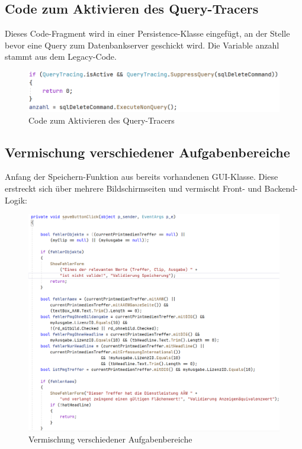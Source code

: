\documentclass[11pt,toc=sectionentrywithoutdots, 
headheight=44pt, headings=optiontoheadandtoc, hyperfootnotes=false, hypertexnames=false]{scrartcl}
\begin{document}
 \subsection{Code zum Aktivieren des Query-Tracers}
Dieses Code-Fragment wird in einer Persistence-Klasse eingefügt, an der Stelle bevor eine Query zum Datenbankserver geschickt wird. Die Variable \glqq anzahl\grqq{} stammt aus dem Legacy-Code.
 \label{fig:Code zum Aktivieren des Query-Tracers}

 \begin{figure}[H]
 \centering

	\includegraphics[scale=0.7]{snippet.png}
	 \caption{Code zum Aktivieren des Query-Tracers}
 \end{figure}


 
 \subsection{Vermischung verschiedener Aufgabenbereiche}
 \label{fig:Vermischung verschiedener Aufgabenbereiche}
Anfang der Speichern-Funktion aus bereits vorhandenen GUI-Klasse. Diese erstreckt sich über mehrere Bildschirmseiten und vermischt Front- und Backend-Logik:
 \begin{figure}[htp]
 \centering

	\includegraphics[scale=0.6]{SeparationOfConcerns.png}
	 \caption{Vermischung verschiedener Aufgabenbereiche}
 \end{figure}
 \clearpage
 
\end{document}
